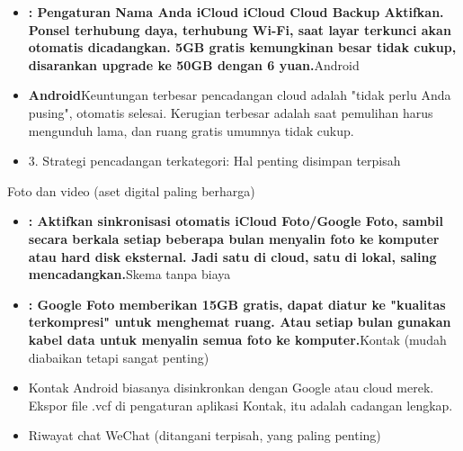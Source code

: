 
\begin{itemize}
  \item \textbf{: Pengaturan Nama Anda iCloud iCloud Cloud Backup Aktifkan. Ponsel terhubung daya, terhubung Wi-Fi, saat layar terkunci akan otomatis dicadangkan. 5GB gratis kemungkinan besar tidak cukup, disarankan upgrade ke 50GB dengan 6 yuan.}Android
  \item \textbf{Android}Keuntungan terbesar pencadangan cloud adalah "tidak perlu Anda pusing", otomatis selesai. Kerugian terbesar adalah saat pemulihan harus mengunduh lama, dan ruang gratis umumnya tidak cukup.
  \item 3. Strategi pencadangan terkategori: Hal penting disimpan terpisah
\end{itemize}


Foto dan video (aset digital paling berharga)


\begin{itemize}
  \item \textbf{: Aktifkan sinkronisasi otomatis iCloud Foto/Google Foto, sambil secara berkala setiap beberapa bulan menyalin foto ke komputer atau hard disk eksternal. Jadi satu di cloud, satu di lokal, saling mencadangkan.}Skema tanpa biaya
  \item \textbf{: Google Foto memberikan 15GB gratis, dapat diatur ke "kualitas terkompresi" untuk menghemat ruang. Atau setiap bulan gunakan kabel data untuk menyalin semua foto ke komputer.}Kontak (mudah diabaikan tetapi sangat penting)
\end{itemize}


\begin{itemize}
  \item Kontak Android biasanya disinkronkan dengan Google atau cloud merek. Ekspor file .vcf di pengaturan aplikasi Kontak, itu adalah cadangan lengkap.
  \item Riwayat chat WeChat (ditangani terpisah, yang paling penting)
\end{itemize}

